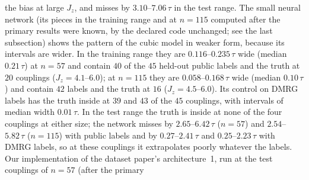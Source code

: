 \documentclass[aps,prx,onecolumn,10pt,nofootinbib,longbibliography,floatfix]{revtex4-2}
\theoremstyle{remark}
\newcommand{\Jz}{J_z}
\begin{document}
the bias at large $\Jz$, and misses by $3.10$--$7.06\,\tau$ in the test range. %
The small neural network (its pieces in the training range and at $n=115$ computed after the primary results were %
known, by the declared code unchanged; see the last subsection) shows the pattern of the cubic model in weaker
form, because its intervals are wider. In the training range they are $0.116$--$0.235\,\tau$ wide (median %
$0.21\,\tau$) at $n=57$ and contain $40$ of the $45$ held-out public labels and the truth at $20$ couplings %
($\Jz=4.1$--$6.0$); at $n=115$ they are $0.058$--$0.168\,\tau$ wide (median $0.10\,\tau$) and contain $42$ labels %
and the truth at $16$ ($\Jz=4.5$--$6.0$). Its control on DMRG labels has the truth inside at $39$ and $43$ of the %
$45$ couplings, with intervals of median width $0.01\,\tau$. In the test range the truth is inside at none of the %
four couplings at either size; the network misses by $2.65$--$6.42\,\tau$ ($n=57$) and $2.54$--$5.82\,\tau$ %
($n=115$) with public labels and by $0.27$--$2.41\,\tau$ and $0.25$--$2.23\,\tau$ with DMRG labels, so at these %
couplings it extrapolates poorly whatever the labels.
Our implementation of the dataset paper's architecture~1, run at the test couplings of $n=57$ (after the primary %
\end{document}
